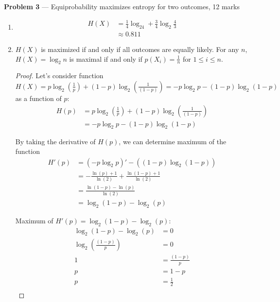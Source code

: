 \documentclass[11pt]{article}
\newcommand{\logbin}{\log_2}
\theoremstyle{definition}
\begin{document}
\item[] \textbf{Problem 3} --- Equiprobability maximizes entropy for two outcomes, 12 marks
\begin{enumerate}
  \item
    \begin{equation*}
    \begin{aligned}
      H(X) &= \frac{1}{4}\logbin 4 + \frac{3}{4}\logbin {\frac{4}{3}} \\
           &\approx 0.811
    \end{aligned}
    \end{equation*}
  \item
    $H(X)$ is maximized if and only if all outcomes are equally likely. For any $n$, $H(X) = \logbin n$ is maximal if and only if $p(X_i) = \frac{1}{n}$ for $1 \leq i \leq n$.
    \begin{proof}
      Let's consider function $H(X) = p\logbin (\frac{1}{p}) + (1 - p)\logbin (\frac{1}{(1 - p)}) = -p\logbin p - (1 - p)\logbin (1 - p)$ as a function of $p$:
      \begin{equation*}
      \begin{aligned}
        H(p) &= p\logbin (\frac{1}{p}) + (1 - p)\logbin (\frac{1}{(1 - p)}) \\
             &= -p\logbin p - (1 - p)\logbin (1 - p)
      \end{aligned}
      \end{equation*}

      By taking the derivative of $H(p)$, we can determine maximum of the function
      \begin{equation*}
      \begin{aligned}
        H'(p) &= (-p\logbin p)' - ((1 - p)\logbin (1 - p)) \\
              &= -\frac{\ln (p) + 1}{\ln(2)} + \frac{\ln(1 - p) + 1}{\ln (2)} \\
              &= \frac{\ln (1 - p) - \ln (p)}{\ln (2)} \\
              &= \logbin (1-p) - \logbin (p)
      \end{aligned}
      \end{equation*}

      Maximum of $H'(p) = \logbin (1-p) - \logbin (p)$:
      \begin{equation*}
      \begin{aligned}
        \logbin (1-p) - \logbin (p) &= 0 \\
        \logbin (\frac{(1 - p)}{p}) &= 0 \\
        1 &= \frac{(1 - p)}{p} \\
        p &= 1 - p \\
        p &= \frac{1}{2} \\
      \end{aligned}
      \end{equation*}


\end{proof}
\end{enumerate}
\end{document}

